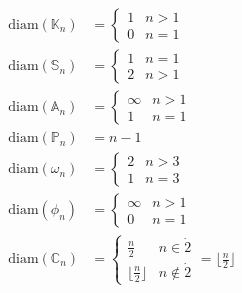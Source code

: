 \documentclass[../main.tex]{subfiles}
\begin{document}
\begin{align*}
	\text{diam}(\mathbb{K}_n) &=
	\begin{cases}
		1&n>1\\
		0 &n=1
	\end{cases}
	\\
	\text{diam}(\mathbb{S}_n) &=
	\begin{cases}
		1 & n=1\\
		2 &n>1
	\end{cases}
	\\
	\text{diam}(\mathbb{A}_n) &=
	\begin{cases}
		\infty &n>1\\
		1 &n=1
	\end{cases}\\
	\text{diam}(\mathbb{P}_n) &= n-1\\
	\text{diam}(\omega_n) &=
	\begin{cases}
		2 &n >3\\
		1 &n =3
	\end{cases}\\
	\text{diam}(\phi_n) &=
	\begin{cases}
		\infty &n >1\\
		0 &n =1
	\end{cases}\\
	\text{diam}(\mathbb{C}_n) &=
	\begin{cases}
		\frac{n}{2} &n\in \dot{2}\\
		\lfloor \frac{n}{2} \rfloor &n \notin \dot{2}
	\end{cases}
	= \lfloor \frac{n}{2} \rfloor
\end{align*}
\end{document}
